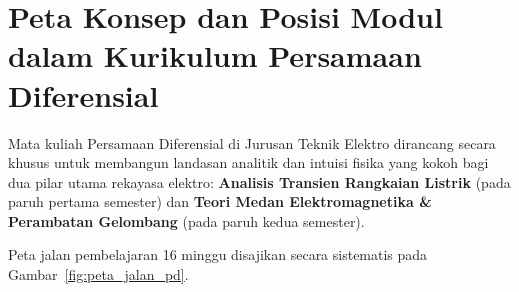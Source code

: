 \documentclass[11pt,a4paper]{article}
\theoremstyle{definition}
\begin{document}
\newpage

\section{Peta Konsep dan Posisi Modul dalam Kurikulum Persamaan Diferensial}

Mata kuliah Persamaan Diferensial di Jurusan Teknik Elektro dirancang secara khusus untuk membangun landasan analitik dan intuisi fisika yang kokoh bagi dua pilar utama rekayasa elektro: \textbf{Analisis Transien Rangkaian Listrik} (pada paruh pertama semester) dan \textbf{Teori Medan Elektromagnetika \& Perambatan Gelombang} (pada paruh kedua semester).

Peta jalan pembelajaran 16 minggu disajikan secara sistematis pada Gambar~\ref{fig:peta_jalan_pd}.
\end{document}
